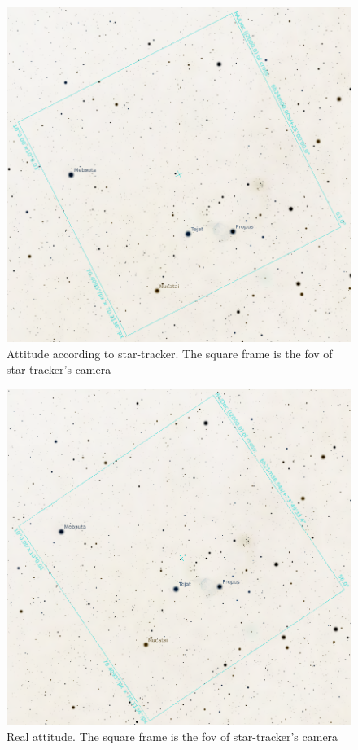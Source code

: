 \documentclass[12pt,a4paper,twoside]{article}
\begin{document}
\begin{figure}[!htbp]
\includegraphics[scale=0.29]{example_3.png}
\centering
\caption[Attitude according to star-tracker]{Attitude according to star-tracker. The square frame is the \gls{fov} of star-tracker's camera}
\label{fig:example_7}
\end{figure}

\begin{figure}[!htbp]
\includegraphics[scale=0.29]{example_4.png}
\centering
\caption[Real attitude]{Real attitude. The square frame is the \gls{fov} of star-tracker's camera}
\label{fig:example_8}
\end{figure}
\end{document}
